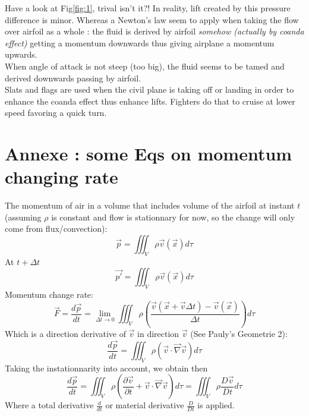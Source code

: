 \documentclass[a4paper,10pt]{article}
\begin{document}
Have a look at Fig\ref{fig:1}, trival isn't it?! In reality, lift created by this pressure difference is minor. Whereas a Newton's law seem to apply when taking the flow over airfoil as a whole : the fluid is derived by airfoil {\it somehow (actually by coanda effect)} getting a momentum downwards thus giving airplane a momentum upwards.\\

When angle of attack is not steep (too big), the fluid seems to be tamed and derived downwards passing by airfoil.\\

Slats and flags are used when the civil plane is taking off or landing in order to enhance the coanda effect thus enhance lifts. Fighters do that to cruise at lower speed favoring a quick turn.


\section{Annexe : some Eqs on momentum changing rate}

The momentum of air in a volume that includes volume of the airfoil at instant $t$ (assuming $\rho$ is constant and flow is stationnary for now, so the change will only come from flux/convection):
$$\vec{p} = \iiint_V \rho\vec{v}(\vec{x}) d\tau$$
At $t+\Delta t$
$$\vec{p'} = \iiint_V \rho\vec{v}(\vec{x}) d\tau$$
Momentum change rate:
$$\vec{F}=\frac{d\vec{p}}{dt}= \lim_{\Delta t \to 0} \iiint_V \rho (\frac{\vec{v}(\vec{x}+\vec{v}\Delta t) - \vec{v}(\vec{x})}{\Delta t}) d\tau$$
Which is a direction derivative of $\vec{v}$ in direction $\vec{v}$ (See Pauly's Geometrie 2):
$$\frac{d\vec{p}}{dt}= \iiint_V \rho(\vec{v} \cdot \vec{\nabla} \vec{v}) d\tau$$
Taking the instationnarity into account, we obtain then
$$\frac{d\vec{p}}{dt}= \iiint_V \rho(\frac{\partial\vec{v}}{\partial t} + \vec{v} \cdot \vec{\nabla} \vec{v}) d\tau = \iiint_V \rho \frac{D\vec{v}}{Dt} d\tau$$
Where a total derivative $\frac{d}{dt}$ or material derivative $\frac{D}{Dt}$ is applied. \\
\end{document}

